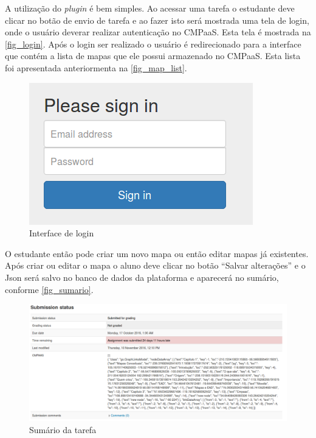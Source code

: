 \documentclass[
	12pt,				%
	openright,			%
	oneside,			%
	a4paper,			%
	english,			%
	french,				%
	spanish,			%
	brazil				%
	]{abntex2}
\begin{document}
A utilização do \textit{plugin} é bem simples. Ao acessar uma tarefa o estudante deve clicar no botão de envio de tarefa e ao fazer isto será mostrada uma tela de login, onde o usuário deverar realizar autenticação no CMPaaS. Esta tela é mostrada na \autoref{fig_login}. Após o login ser realizado o usuário é redirecionado para a interface que contém a lista de mapas que ele possui armazenado no CMPaaS. Esta lista foi apresentada anteriormenta na \autoref{fig_map_list}. 

\begin{figure}[htb]
	\caption{\label{fig_login} Interface de login}
	\begin{center}
		\includegraphics[scale=0.5]{login.png}
	\end{center}
\end{figure}

O estudante então pode criar um novo mapa ou então editar mapas já existentes. Após criar ou editar o mapa o aluno deve clicar no botão “Salvar alterações” e o Json será salvo no banco de dados da plataforma e aparecerá no sumário, conforme \autoref{fig_sumario}. 

\begin{figure}[htb]
	\caption{\label{fig_sumario} Sumário da tarefa}
	\begin{center}
		\includegraphics[scale=0.3]{sumario.png}
	\end{center}
\end{figure}
\end{document}
